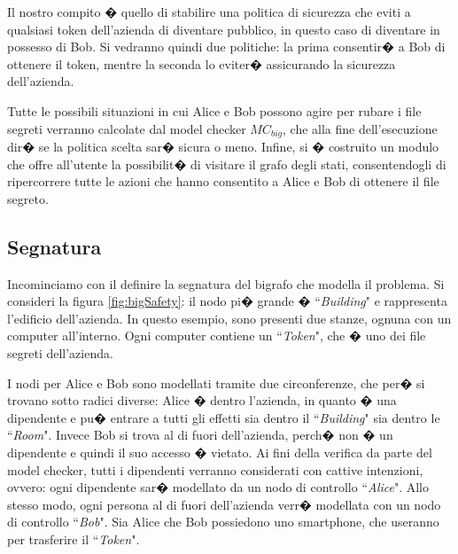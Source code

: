 Il nostro compito � quello di stabilire una politica di sicurezza che eviti a qualsiasi token dell'azienda di diventare pubblico, in questo caso di diventare in possesso di Bob. Si vedranno quindi due politiche: la prima consentir� a Bob di ottenere il token, mentre la seconda lo eviter� assicurando la sicurezza dell'azienda. 

Tutte le possibili situazioni in cui Alice e Bob possono agire per rubare i file segreti verranno calcolate dal model checker $MC_{big}$, che alla fine dell'esecuzione dir� se la politica scelta sar� sicura o meno. Infine, si � costruito un modulo che offre all'utente la possibilit� di visitare il grafo degli stati, consentendogli di ripercorrere tutte le azioni che hanno consentito a Alice e Bob di ottenere il file segreto.


\subsection{Segnatura}
Incominciamo con il definire la segnatura del bigrafo che modella il problema. Si consideri la figura \ref{fig:bigSafety}: il nodo pi� grande � ``\emph{Building}" e rappresenta l'edificio dell'azienda. In questo esempio, sono presenti due stanze, ognuna con un computer all'interno. Ogni computer contiene un ``\emph{Token}", che � uno dei file segreti dell'azienda. 

I nodi per Alice e Bob sono modellati tramite due circonferenze, che per� si trovano sotto radici diverse: Alice � dentro l'azienda, in quanto � una dipendente e pu� entrare a tutti gli effetti sia dentro il ``\emph{Building}" sia dentro le ``\emph{Room}". Invece Bob si trova al di fuori dell'azienda, perch� non � un dipendente e quindi il suo accesso � vietato. Ai fini della verifica da parte del model checker, tutti i dipendenti verranno considerati con cattive intenzioni, ovvero: ogni dipendente sar� modellato da un nodo di controllo ``\emph{Alice}". Allo stesso modo, ogni persona al di fuori dell'azienda verr� modellata con un nodo di controllo ``\emph{Bob}".
Sia Alice che Bob possiedono uno smartphone, che useranno per trasferire il ``\emph{Token}".


